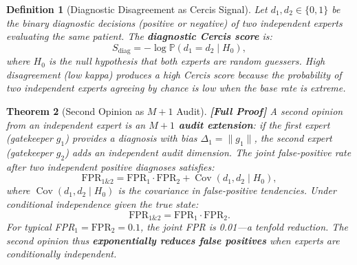 \documentclass[12pt,a4paper]{article}
\newtheorem{theorem}{Theorem}[section]
\newtheorem{definition}[theorem]{Definition}
\theoremstyle{remark}
\newcommand{\Pbb}{\mathbb{P}}
\newcommand{\Cercis}{\textsf{Cercis}}
\DeclareMathOperator{\Cov}{Cov}
\newcommand{\rigorFull}{\textbf{[Full Proof]}}
\begin{document}
\begin{definition}[Diagnostic Disagreement as Cercis Signal]
\label{def:diagnostic_signal}
Let $d_1, d_2 \in \{0, 1\}$ be the binary diagnostic decisions (positive
or negative) of two independent experts evaluating the same patient.
The \textbf{diagnostic Cercis score} is:
\begin{equation}
  S_{\text{diag}} = -\log \Pbb(d_1 = d_2 \mid H_0),
\end{equation}
where $H_0$ is the null hypothesis that both experts are random
guessers. High disagreement (low kappa) produces a high \Cercis{} score
because the probability of two independent experts agreeing by chance is
low when the base rate is extreme.
\end{definition}

\begin{theorem}[Second Opinion as $M+1$ Audit]
\label{thm:second_opinion}
\rigorFull
A second opinion from an independent expert is an \textbf{$M+1$ audit
extension}: if the first expert (gatekeeper $g_1$) provides a diagnosis
with bias $\Delta_1 = \|g_1\|$, the second expert (gatekeeper $g_2$)
adds an independent audit dimension. The joint false-positive rate after
two independent positive diagnoses satisfies:
\begin{equation}
  \text{FPR}_{1\&2} = \text{FPR}_1 \cdot \text{FPR}_2
  + \Cov(d_1, d_2 \mid H_0),
\end{equation}
where $\Cov(d_1, d_2 \mid H_0)$ is the covariance in false-positive
tendencies. Under conditional independence given the true state:
\begin{equation}
  \text{FPR}_{1\&2} = \text{FPR}_1 \cdot \text{FPR}_2.
\end{equation}
For typical FPR$_1 = \text{FPR}_2 = 0.1$, the joint FPR is 0.01---a
tenfold reduction. The second opinion thus \textbf{exponentially reduces
false positives} when experts are conditionally independent.
\end{theorem}
\end{document}

